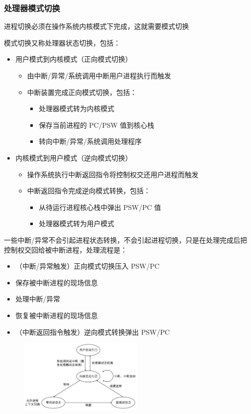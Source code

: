 \documentclass[cs4size,a4paper,10pt]{ctexart}
\begin{document}
	\subsubsection{处理器模式切换}
	进程切换必须在操作系统内核模式下完成，这就需要模式切换

	模式切换又称处理器状态切换，包括：
	\begin{itemize}
		\item 用户模式到内核模式（正向模式切换）
		\begin{itemize}
			\item 由中断/异常/系统调用中断用户进程执行而触发
			\item 中断装置完成正向模式切换，包括：
			\begin{itemize}
				\item 处理器模式转为内核模式 
				\item 保存当前进程的 PC/PSW 值到核心栈
				\item 转向中断/异常/系统调用处理程序
			\end{itemize}
		\end{itemize}
		\item 内核模式到用户模式（逆向模式切换）
		\begin{itemize}
			\item 操作系统执行中断返回指令将控制权交还用户进程而触发
			\item 中断返回指令完成逆向模式转换，包括：
			\begin{itemize}
				\item 从待运行进程核心栈中弹出 PSW/PC 值
				\item 处理器模式转为用户模式
			\end{itemize}
		\end{itemize}
	\end{itemize}

	一些中断/异常不会引起进程状态转换，不会引起进程切换，只是在处理完成后把控制权交回给被中断进程，处理流程是：
	\begin{itemize}
		\item （中断/异常触发）正向模式切换压入 PSW/PC
		\item 保存被中断进程的现场信息
		\item 处理中断/异常
		\item 恢复被中断进程的现场信息
		\item （中断返回指令触发）逆向模式转换弹出 PSW/PC
	\end{itemize}
	\begin{figure}[H]
		\centering
		\includegraphics[width=0.55\textwidth]{img/2.3.4.3}
	\end{figure}
\end{document}
